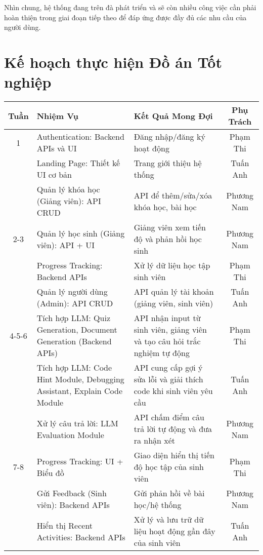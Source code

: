 Nhìn chung, hệ thống đang trên đà phát triển và sẽ còn nhiều công việc cần phải hoàn thiện trong giai đoạn tiếp theo để đáp ứng được đầy đủ các nhu cầu của người dùng.

\newpage
\section*{Kế hoạch thực hiện Đồ án Tốt nghiệp}
\begin{table}[H]
    \centering
    \small 
    \begin{tabular}{|c|p{4.5cm}|p{6.5cm}|c|}
    \hline
    \textbf{Tuần} & \textbf{Nhiệm Vụ} & \textbf{Kết Quả Mong Đợi} & \textbf{Phụ Trách} \\ \hline
    1 & Authentication: Backend APIs và UI & Đăng nhập/đăng ký hoạt động & Phạm Thi \\ \hline
      & Landing Page: Thiết kế UI cơ bản & Trang giới thiệu hệ thống & Tuấn Anh \\ \hline
      & Quản lý khóa học (Giảng viên): API CRUD & API để thêm/sửa/xóa khóa học, bài học & Phương Nam \\ \hline
    2-3 & Quản lý học sinh (Giảng viên): API + UI & Giảng viên xem tiến độ và phản hồi học sinh & Phương Nam \\ \hline
        & Progress Tracking: Backend APIs & Xử lý dữ liệu học tập sinh viên & Phạm Thi \\ \hline
        & Quản lý người dùng (Admin): API CRUD & API quản lý tài khoản (giảng viên, sinh viên) & Tuấn Anh \\ \hline
    4-5-6 & Tích hợp LLM: Quiz Generation, Document Generation (Backend APIs) & API nhận input từ sinh viên, giảng viên và tạo câu hỏi trắc nghiệm tự động & Phạm Thi \\ \hline
        & Tích hợp LLM: Code Hint Module, Debugging Assistant, Explain Code Module & API cung cấp gợi ý sửa lỗi và giải thích code khi sinh viên yêu cầu & Tuấn Anh \\ \hline
        & Xử lý câu trả lời: LLM Evaluation Module & API chấm điểm câu trả lời tự động và đưa ra nhận xét & Phương Nam \\ \hline
    7-8 & Progress Tracking: UI + Biểu đồ & Giao diện hiển thị tiến độ học tập của sinh viên & Phạm Thi \\ \hline
        & Gửi Feedback (Sinh viên): Backend APIs & Gửi phản hồi về bài học/hệ thống & Phương Nam \\ \hline
        & Hiển thị Recent Activities: Backend APIs & Xử lý và lưu trữ dữ liệu hoạt động gần đây của sinh viên & Tuấn Anh \\ \hline

\end{tabular}
\end{table}
